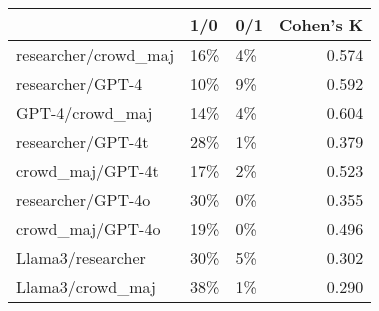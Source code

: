 \begin{table}
\label{tab:crosstab}
\begin{tabular}{lllr}
\toprule
 & 1/0 & 0/1 & Cohen's K \\
\midrule
researcher/crowd\_maj & 16\% & 4\% & 0.574 \\
researcher/GPT-4 & 10\% & 9\% & 0.592 \\
GPT-4/crowd\_maj & 14\% & 4\% & 0.604 \\
researcher/GPT-4t & 28\% & 1\% & 0.379 \\
crowd\_maj/GPT-4t & 17\% & 2\% & 0.523 \\
researcher/GPT-4o & 30\% & 0\% & 0.355 \\
crowd\_maj/GPT-4o & 19\% & 0\% & 0.496 \\
Llama3/researcher & 30\% & 5\% & 0.302 \\
Llama3/crowd\_maj & 38\% & 1\% & 0.290 \\
\bottomrule
\end{tabular}
\end{table}
